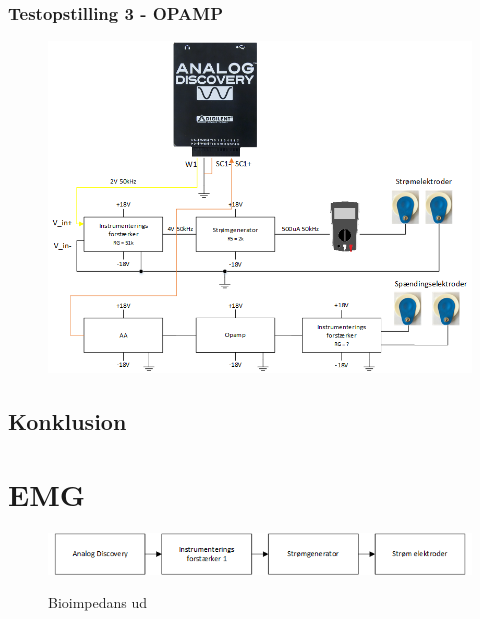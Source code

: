 \subsection{Testopstilling 3 - OPAMP}
\begin{figure}[H]
\centering
{\includegraphics[width=\linewidth]
{Figure/modificeretkredslob}}
\caption{}
\label{modificeretkredslob}
\end{figure}

\section{Konklusion}

\chapter{EMG}






\begin{figure}[H]
\centering
{\includegraphics[width=\linewidth]
{Figure/analyse1}}
\caption{Bioimpedans ud}
\label{fig:analyse1}
\end{figure}

